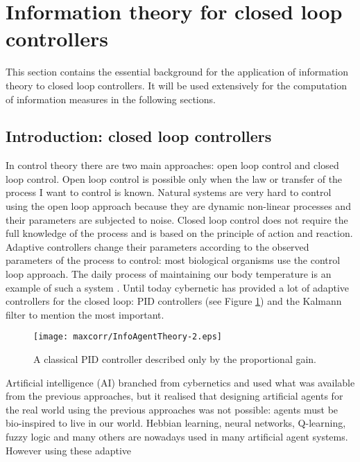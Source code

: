 
\section{Information theory for closed loop controllers \label{Introduction:InfoTheoryClosedLoop}}

This section contains the essential background for the application of information
theory to closed loop controllers.
It will be used extensively for the computation of information measures in the 
following sections.

\subsection{Introduction: closed loop controllers}
In control theory there are two main approaches: open loop control and closed
loop control. Open loop control is possible only when the law or transfer of the
 process I want to control is known. Natural systems are very hard to control
using the open loop approach because they are dynamic non-linear processes and
their parameters are subjected to noise. Closed loop control does not require
the full knowledge of the process and is based on the principle of action and reaction.
Adaptive controllers change their parameters according to the observed parameters of
the process to control: most biological organisms use the control loop approach.
The daily process of maintaining our body temperature is an example of such a system \citep{HumanBody}.
Until today cybernetic has provided a lot of adaptive controllers for the closed loop:
PID controllers
(see Figure \ref{Figure:maxcorr:PID}) and the Kalmann filter to mention the most important.
\begin{figure}[ht]
  \begin{center}
    \texttt{[image: maxcorr/InfoAgentTheory-2.eps]}
    \caption[Classical PID controller]{
	     A classical PID controller described only by the proportional gain.
	      \label{Figure:maxcorr:PID}}
  \end{center}
\end{figure}
Artificial intelligence (AI) branched from cybernetics and used what was available
from the previous approaches, but it realised that designing artificial agents
for the real world using the previous
approaches was not possible: agents must be bio-inspired to live in our world.
Hebbian learning, neural networks, Q-learning, fuzzy logic and many others are
nowadays used in many artificial agent systems. However using these adaptive
